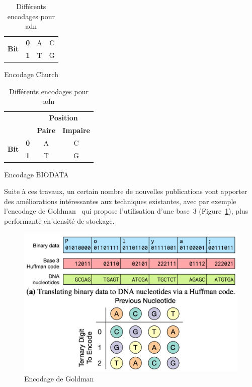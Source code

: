 \documentclass[a4paper]{report}
\begin{document}
\begin{table}[ht]
\centering
\setlength{\tabcolsep}{.8em}
\renewcommand\arraystretch{1.5}

\begin{subtable}[t]{.45\textwidth}
  \centering
  \begin{tabular}{|c|c|c|c|}
  \hline
  \multirow{2}{*}{\textbf{Bit}} & \textbf{0} & A & C \\
  \cline{2-4}
  & \textbf{1} & T & G \\
  \hline
  \end{tabular}
  \caption{Encodage Church~\cite{church2012next}}
  \label{tab:church-encoding}
\end{subtable}
\hfill
\begin{subtable}[t]{.54\textwidth}
  \centering
  \begin{tabular}{|c|c|c|c|}
  \cline{3-4}
  \multicolumn{2}{c|}{} & \multicolumn{2}{c|}{\textbf{Position}} \\
  \cline{3-4}
  \multicolumn{2}{c|}{} & \textbf{Paire} & \textbf{Impaire} \\
  \hline
  \multirow{2}{*}{\textbf{Bit}} & \textbf{0} & A & C \\
  \cline{2-4}
  & \textbf{1} & T & G \\
  \hline
  \end{tabular}
  \caption{Encodage BIODATA}
  \label{tab:biodata-encoding}
\end{subtable}

\caption{Différents encodages pour \ac{adn}}
\label{tab:dna-encodings}
\end{table}

Suite à ces travaux, un certain nombre de nouvelles publications vont apporter des améliorations intéressantes aux techniques existantes,
avec par exemple l'encodage de Goldman~\cite{goldman2013towards} qui propose l'utilisation d'une base~3 (Figure~\ref{fig:goldman-encoding}),
plus performante en densité de stockage.

\begin{figure}[ht]
\centering
\includegraphics[width=.6\textwidth]{goldman-encoding}
\caption{Encodage de Goldman~\cite{goldman2013towards}}
\label{fig:goldman-encoding}
\end{figure}
\end{document}
